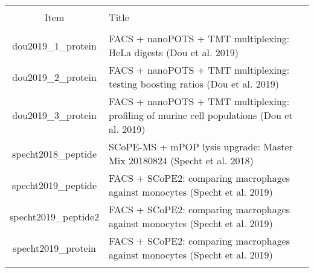 
\begin{tabular}{@{\extracolsep{5pt}} cl} 
\\[-1.8ex]\hline 
\hline \\[-1.8ex] 
Item & Title \\ 
\hline \\[-1.8ex] 
dou2019\_1\_protein & FACS + nanoPOTS + TMT multiplexing: HeLa digests (Dou et al. 2019) \\ 
dou2019\_2\_protein & FACS + nanoPOTS + TMT multiplexing: testing boosting ratios (Dou et al. 2019) \\ 
dou2019\_3\_protein & FACS + nanoPOTS + TMT multiplexing: profiling of murine cell populations (Dou et al. 2019) \\ 
specht2018\_peptide & SCoPE-MS + mPOP lysis upgrade: Master Mix 20180824 (Specht et al. 2018) \\ 
specht2019\_peptide & FACS + SCoPE2: comparing macrophages against monocytes (Specht et al. 2019) \\ 
specht2019\_peptide2 & FACS + SCoPE2: comparing macrophages against monocytes (Specht et al. 2019) \\ 
specht2019\_protein & FACS + SCoPE2: comparing macrophages against monocytes (Specht et al. 2019) \\ 
\hline \\[-1.8ex] 
\end{tabular} 
